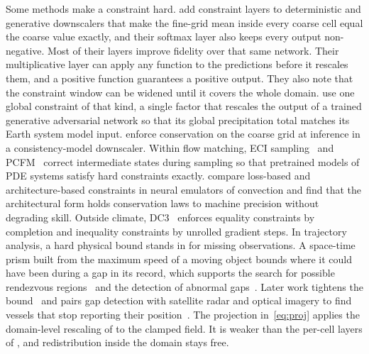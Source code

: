 \documentclass[sigconf,nonacm]{acmart}
\begin{document}
Some methods make a constraint hard. \citet{harder2023hard} add constraint layers to deterministic and generative downscalers that make the fine-grid mean inside every coarse cell equal the coarse value exactly, and their softmax layer also keeps every output non-negative. Most of their layers improve fidelity over that same network. Their multiplicative layer can apply any function to the predictions before it rescales them, and a positive function guarantees a positive output. They also note that the constraint window can be widened until it covers the whole domain. \citet{hess2022physically} use one global constraint of that kind, a single factor that rescales the output of a trained generative adversarial network so that its global precipitation total matches its Earth system model input. \citet{bochow2026physics} enforce conservation on the coarse grid at inference in a consistency-model downscaler. Within flow matching, ECI sampling~\citep{cheng2025gradient} and PCFM~\citep{utkarsh2025physics} correct intermediate states during sampling so that pretrained models of PDE systems satisfy hard constraints exactly. \citet{beucler2021enforcing} compare loss-based and architecture-based constraints in neural emulators of convection and find that the architectural form holds conservation laws to machine precision without degrading skill. Outside climate, DC3~\citep{donti2021dc3} enforces equality constraints by completion and inequality constraints by unrolled gradient steps. In trajectory analysis, a hard physical bound stands in for missing observations. A space-time prism built from the maximum speed of a moving object bounds where it could have been during a gap in its record, which supports the search for possible rendezvous regions~\citep{sharma2020analyzing,sharma2022analyzing} and the detection of abnormal gaps~\citep{sharma2022abnormal,sharma2024physics}. Later work tightens the bound~\citep{sharma2022tighter} and pairs gap detection with satellite radar and optical imagery to find vessels that stop reporting their position~\citep{sharma2026darkvesselnet}. The projection in~\cref{eq:proj} applies the domain-level rescaling of \citeauthor{hess2022physically} to the clamped field. It is weaker than the per-cell layers of \citeauthor{harder2023hard}, and redistribution inside the domain stays free.
\end{document}
